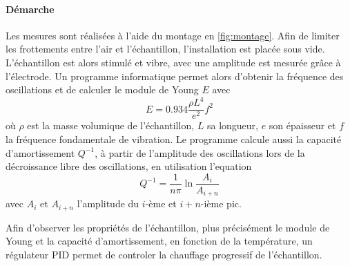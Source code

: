 \paragraph{Démarche} Les mesures sont réalisées à l'aide du montage en \autoref{fig:montage}. Afin de limiter les frottements entre l'air et l'échantillon, l'installation est placée sous vide. L'échantillon est alors stimulé et vibre, avec une amplitude est mesurée grâce à l'électrode. Un programme informatique permet alors d'obtenir la fréquence des oscillations et de calculer le module de Young \(E\) avec
\begin{equation}
    E = 0.934 \frac{\rho L^4}{e^2}f^2
    \label{eq:young_programme}
\end{equation}
où \(\rho\) est la masse volumique de l'échantillon, \(L\) sa longueur, \(e\) son épaisseur et \(f\) la fréquence fondamentale de vibration. Le programme calcule aussi la capacité d'amortissement \(Q^{-1}\), à partir de l'amplitude des oscillations lors de la décroissance libre des oscillations, en utilisation l'equation
\begin{equation}
    Q^{-1} = \frac{1}{n \pi} \ln \frac{A_i}{A_{i+n}}
    \label{eq:q1_programme}
\end{equation}
avec \(A_i\) et \(A_{i+n}\) l'amplitude du \(i\)-ème et \(i+n\)-ième pic.

Afin d'observer les propriétés de l'échantillon, plus précisément le module de Young et la capacité d'amortissement, en fonction de la température, un régulateur PID permet de controler la chauffage progressif de l'échantillon.
